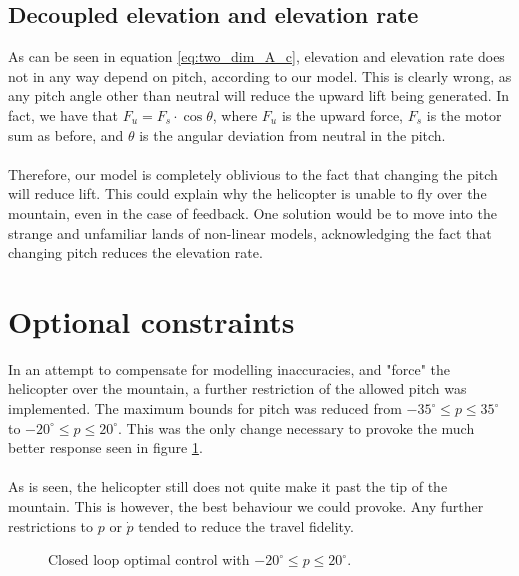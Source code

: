 \subsection{Decoupled elevation and elevation rate}\label{sec:decouple_discussion}
As can be seen in equation \ref{eq:two_dim_A_c}, elevation and elevation rate does not in any way depend on pitch, according to our model. This is clearly wrong, as any pitch angle other than neutral will reduce the upward lift being generated. In fact, we have that $F_u = F_s\cdot\cos\theta$, where $F_u$ is the upward force, $F_s$ is the motor sum as before, and $\theta$ is the angular deviation from neutral in the pitch.\\
\\
Therefore, our model is completely oblivious to the fact that changing the pitch will reduce lift. This could explain why the helicopter is unable to fly over the mountain, even in the case of feedback. One solution would be to move into the strange and unfamiliar lands of non-linear models, acknowledging the fact that changing pitch reduces the elevation rate.

\section{Optional constraints}
In an attempt to compensate for modelling inaccuracies, and "force" the helicopter over the mountain, a further restriction of the allowed pitch was implemented. The maximum bounds for pitch was reduced from $-35^\circ\leq p\leq 35^\circ$ to $-20^\circ\leq p\leq 20^\circ$. This was the only change necessary to provoke the much better response seen in figure \ref{fig:closed_loop_restricted}.\\
\\
As is seen, the helicopter still does not quite make it past the tip of the mountain. This is however, the best behaviour we could provoke. Any further restrictions to $p$ or $\dot{p}$ tended to reduce the travel fidelity.
\begin{figure}
        \centering
        \setlength{\figureheight}{6cm}
        \setlength{\figurewidth}{10cm}
        
        \caption{Closed loop optimal control with $-20^\circ\leq p\leq 20^\circ$.} 
\label{fig:closed_loop_restricted} 
\end{figure}